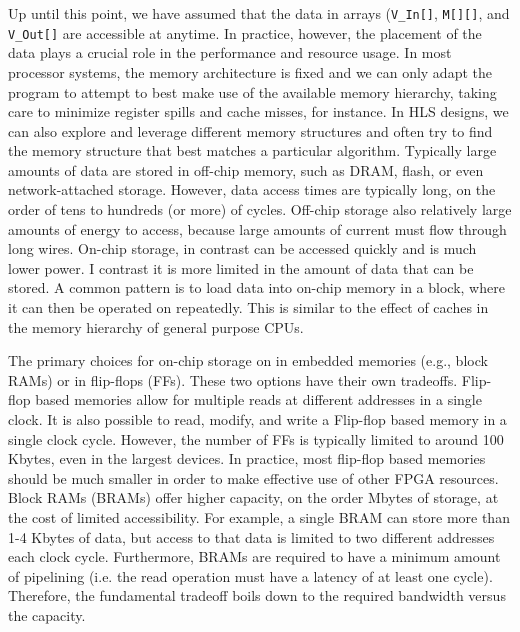 Up until this point, we have assumed that the data in arrays (\lstinline|V_In[]|, \lstinline|M[][]|, and \lstinline|V_Out[]| are accessible at anytime.  In practice, however, the placement of the data plays a crucial role in the performance and resource usage. In most processor systems, the memory architecture is fixed and we can only adapt the program to attempt to best make use of the available memory hierarchy, taking care to minimize register spills and cache misses, for instance.  In HLS designs, we can also explore and leverage different memory structures and often try to find the memory structure that best matches a particular algorithm.  Typically large amounts of data are stored in off-chip memory, such as DRAM, flash, or even network-attached storage. However, data access times are typically long, on the order of tens to hundreds (or more) of cycles. Off-chip storage also relatively large amounts of energy to access, because large amounts of current must flow through long wires.  On-chip storage, in contrast can be accessed quickly and is much lower power.  I contrast it is more limited in the amount of data that can be stored.  A common pattern is to load data into on-chip memory in a block, where it can then be operated on repeatedly.  This is similar to the effect of caches in the memory hierarchy of general purpose CPUs.

The primary choices for on-chip storage on in embedded memories (e.g., block RAMs) or in flip-flops (FFs). These two options have their own tradeoffs. Flip-flop based memories allow for multiple reads at different addresses in a single clock.  It is also possible to read, modify, and write a Flip-flop based memory in a single clock cycle.  However, the number of FFs is typically limited to around 100 Kbytes, even in the largest devices. In practice, most flip-flop based memories should be much smaller in order to make effective use of other FPGA resources.  Block RAMs (BRAMs) offer higher capacity, on the order Mbytes of storage, at the cost of limited accessibility. For example, a single BRAM can store more than 1-4 Kbytes of data, but access to that data is limited to two different addresses each clock cycle. Furthermore, BRAMs are required to have a minimum amount of pipelining (i.e. the read operation must have a latency of at least one cycle).  Therefore, the fundamental tradeoff boils down to the required bandwidth versus the capacity. 

